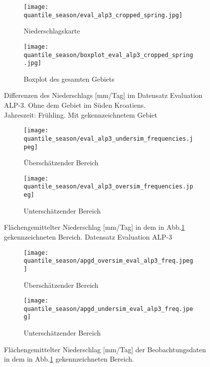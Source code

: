 \begin{figure}[h!]
	\begin{subfigure}{0.49\textwidth}
		\texttt{[image: quantile\_season/eval\_alp3\_cropped\_spring.jpg]}
		\caption{Niederschlagskarte}
		\label{fig:seasons:cropped eval_alp_3}
	\end{subfigure}
	\begin{subfigure}{0.49\textwidth}
		\texttt{[image: quantile\_season/boxplot\_eval\_alp3\_cropped\_spring.jpg]}
		\caption{Boxplot des gesamten Gebiets}
		\label{fig:seasons:cropped eval_alp_3_boxplot}
	\end{subfigure}
	\caption{Differenzen des Niederschlags [mm/Tag] im Datensatz Evaluation ALP-3. Ohne dem Gebiet im Süden Kroatiens.\\
	Jahreszeit: Frühling. Mit gekennzeichnetem Gebiet}
\end{figure}

\begin{figure}[h!]
	\begin{subfigure}{0.49\textwidth}
		\texttt{[image: quantile\_season/eval\_alp3\_undersim\_frequencies.jpeg]}
		\caption{Überschätzender Bereich}
		\label{fig:seasons:oversim eval_alp_3}
	\end{subfigure}
	\begin{subfigure}{0.49\textwidth}
		\texttt{[image: quantile\_season/eval\_alp3\_oversim\_frequencies.jpeg]}
		\caption{Unterschätzender Bereich}
		\label{fig:seasons:undersim_eval_alp_3}
	\end{subfigure}
	\caption{Flächengemittelter Niederschlag [mm/Tag] in dem in Abb.\ref{fig:seasons:cropped eval_alp_3} gekennzeichneten Bereich. Datensatz Evaluation ALP-3}
	\label{fig:seasons:overunder_eval_alp3}
\end{figure}
\begin{figure}[h!]
	\begin{subfigure}{0.49\textwidth}
		\texttt{[image: quantile\_season/apgd\_oversim\_eval\_alp3\_freq.jpeg]}
		\caption{Überschätzender Bereich}
		\label{fig:seasons:oversim eval_alp_3_obs}
	\end{subfigure}
	\begin{subfigure}{0.49\textwidth}
		\texttt{[image: quantile\_season/apgd\_undersim\_eval\_alp3\_freq.jpeg]}
		\caption{Unterschätzender Bereich}
		\label{fig:seasons:undersim_eval_alp_3_obs}
	\end{subfigure}
	\caption{Flächengemittelter Niederschlag [mm/Tag] der Beobachtungsdaten in dem in Abb.\ref{fig:seasons:cropped eval_alp_3} gekennzeichneten Bereich.}
	\label{fig:seasons:overunder_obs_eval_alp3}
\end{figure}

